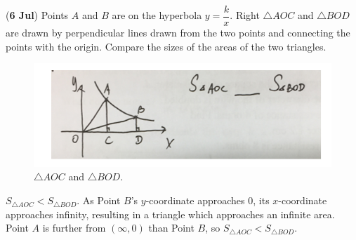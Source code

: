 \documentclass[12pt,answers]{exam}
\renewcommand{\frac}[2]{\dfrac{#1}{#2}}
\newcommand{\qndate}[2]{(\textbf{#1 #2})}
\begin{document}
\begin{questions}
	\question \qndate{6}{Jul} Points $A$ and $B$ are on the hyperbola $y = \frac{k}{x}$. Right $\triangle AOC$
	and $\triangle BOD$ are drawn by perpendicular lines drawn from the two points and connecting
	the points with the origin. Compare the sizes of the areas of the two triangles.
	\begin{figure}[htpb]
		\centering
		\includegraphics[scale=.8]{./images/0706_Tri.png}
		\caption{$\triangle AOC$ and $\triangle BOD$.}
		\label{fig:0706_Tri}
	\end{figure}
	\begin{solution}
		$S_{\triangle AOC} < S_{\triangle BOD}$.
		As Point $B$'s $y$-coordinate approaches 0, its $x$-coordinate approaches infinity,
		resulting in a triangle which approaches an infinite area. Point $A$ is further from
		$(\infty, 0)$ than Point $B$, so $S_{\triangle AOC} < S_{\triangle BOD}$.
	\end{solution}


\end{questions}
\end{document}
